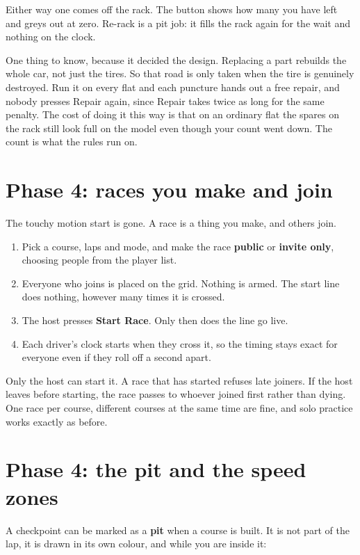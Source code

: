 \documentclass[11pt,a4paper]{article}
\begin{document}
Either way one comes off the rack. The button shows how many you have left and
greys out at zero. Re-rack is a pit job: it fills the rack again for the wait
and nothing on the clock.

One thing to know, because it decided the design. Replacing a part rebuilds
the whole car, not just the tires. So that road is only taken when the tire is
genuinely destroyed. Run it on every flat and each puncture hands out a free
repair, and nobody presses Repair again, since Repair takes twice as long for
the same penalty. The cost of doing it this way is that on an ordinary flat
the spares on the rack still look full on the model even though your count
went down. The count is what the rules run on.

\section{Phase 4: races you make and join}

The touchy motion start is gone. A race is a thing you make, and others join.

\begin{enumerate}
  \item Pick a course, laps and mode, and make the race \textbf{public} or
        \textbf{invite only}, choosing people from the player list.
  \item Everyone who joins is placed on the grid. Nothing is armed. The start
        line does nothing, however many times it is crossed.
  \item The host presses \textbf{Start Race}. Only then does the line go live.
  \item Each driver's clock starts when they cross it, so the timing stays
        exact for everyone even if they roll off a second apart.
\end{enumerate}

Only the host can start it. A race that has started refuses late joiners. If
the host leaves before starting, the race passes to whoever joined first
rather than dying. One race per course, different courses at the same time are
fine, and solo practice works exactly as before.

\section{Phase 4: the pit and the speed zones}

A checkpoint can be marked as a \textbf{pit} when a course is built. It is not
part of the lap, it is drawn in its own colour, and while you are inside it:
\end{document}
